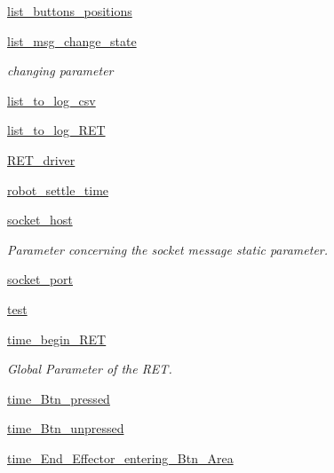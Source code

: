 \begin{DoxyCompactItemize}
\hyperlink{classRET__Parameter_1_1RET__Parameter_ae07c53483c9c3ff8611ec4d7401fa71f}{list\+\_\+buttons\+\_\+positions}
\item 
\hyperlink{classRET__Parameter_1_1RET__Parameter_abaf8b3fbd21f3e6ea9ca3bda523318ed}{list\+\_\+msg\+\_\+change\+\_\+state}
\begin{DoxyCompactList}\small\item\em changing parameter \end{DoxyCompactList}\item 
\hyperlink{classRET__Parameter_1_1RET__Parameter_a5331c4ed916397c2e17b0ad1e50edcf2}{list\+\_\+to\+\_\+log\+\_\+csv}
\item 
\hyperlink{classRET__Parameter_1_1RET__Parameter_ac9c7e27ca9d1bc47231da53cca643f57}{list\+\_\+to\+\_\+log\+\_\+\+R\+ET}
\item 
\hyperlink{classRET__Parameter_1_1RET__Parameter_accada53c1f876f08e9c5beb661846ca1}{R\+E\+T\+\_\+driver}
\item 
\hyperlink{classRET__Parameter_1_1RET__Parameter_a153ea6721b57c14eea55728d46eae779}{robot\+\_\+settle\+\_\+time}
\item 
\hyperlink{classRET__Parameter_1_1RET__Parameter_afc570ca4c1952bb0a14a0511160df54a}{socket\+\_\+host}
\begin{DoxyCompactList}\small\item\em Parameter concerning the socket message static parameter. \end{DoxyCompactList}\item 
\hyperlink{classRET__Parameter_1_1RET__Parameter_a736f9eb916b0d398d68fc3e0c8f3f953}{socket\+\_\+port}
\item 
\hyperlink{classRET__Parameter_1_1RET__Parameter_a05a671c66aefea124cc08b76ea6d30bb}{test}
\item 
\hyperlink{classRET__Parameter_1_1RET__Parameter_a0fc681ced6250a0d860270ba7db63e5a}{time\+\_\+begin\+\_\+\+R\+ET}
\begin{DoxyCompactList}\small\item\em Global Parameter of the R\+ET. \end{DoxyCompactList}\item 
\hyperlink{classRET__Parameter_1_1RET__Parameter_a97d4004b8cc193cac606e77e11d656c1}{time\+\_\+\+Btn\+\_\+pressed}
\item 
\hyperlink{classRET__Parameter_1_1RET__Parameter_adc56eeb2afda15de3960614349285010}{time\+\_\+\+Btn\+\_\+unpressed}
\item 
\hyperlink{classRET__Parameter_1_1RET__Parameter_a1dbe7829bfc697ea985c80c74990e641}{time\+\_\+\+End\+\_\+\+Effector\+\_\+entering\+\_\+\+Btn\+\_\+\+Area}

\end{DoxyCompactItemize}
